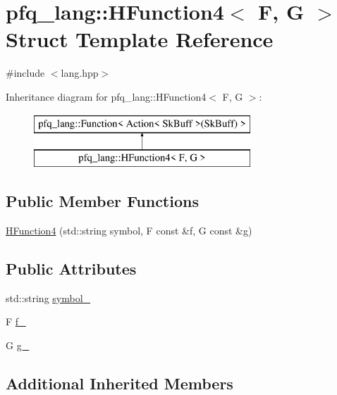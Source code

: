 \hypertarget{structpfq__lang_1_1HFunction4}{\section{pfq\+\_\+lang\+:\+:H\+Function4$<$ F, G $>$ Struct Template Reference}
\label{structpfq__lang_1_1HFunction4}
}


{\ttfamily \#include $<$lang.\+hpp$>$}

Inheritance diagram for pfq\+\_\+lang\+:\+:H\+Function4$<$ F, G $>$\+:\begin{figure}[H]
\begin{center}
\leavevmode
\includegraphics[height=2.000000cm]{structpfq__lang_1_1HFunction4}
\end{center}
\end{figure}
\subsection*{Public Member Functions}
\begin{DoxyCompactItemize}
\item 
\hyperlink{structpfq__lang_1_1HFunction4_abc43b6b36341cd71c4d6a6de0d7265dc}{H\+Function4} (std\+::string symbol, F const \&f, G const \&g)
\end{DoxyCompactItemize}
\subsection*{Public Attributes}
\begin{DoxyCompactItemize}
\item 
std\+::string \hyperlink{structpfq__lang_1_1HFunction4_ad58dbdba4ab08dc0d78cce96f16b02c5}{symbol\+\_\+}
\item 
F \hyperlink{structpfq__lang_1_1HFunction4_a4a05b28c32d35ba19353d5c7fe028aa0}{f\+\_\+}
\item 
G \hyperlink{structpfq__lang_1_1HFunction4_ad7cf948fb1775430924e0a46dece3d12}{g\+\_\+}
\end{DoxyCompactItemize}
\subsection*{Additional Inherited Members}


